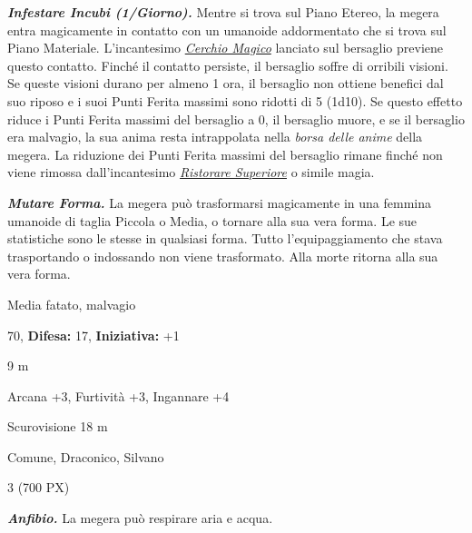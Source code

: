 \begin{multicols}{2}
{\emph{\textbf{Infestare Incubi (1/Giorno).}} Mentre si trova sul Piano Etereo, la megera entra magicamente in contatto con un umanoide addormentato che si trova sul Piano Materiale. L'incantesimo \emph{\hyperlink{Cerchio Magico}{Cerchio Magico}} lanciato sul bersaglio previene questo contatto. Finché il contatto persiste, il bersaglio soffre di orribili visioni. Se queste visioni durano per almeno 1 ora, il bersaglio non ottiene benefici dal suo riposo e i suoi Punti Ferita massimi sono ridotti di 5 (1d10). Se questo effetto riduce i Punti Ferita massimi del bersaglio a 0, il bersaglio muore, e se il bersaglio era malvagio, la sua anima resta intrappolata nella \emph{borsa delle anime} della megera. La riduzione dei Punti Ferita massimi del bersaglio rimane finché non viene rimossa dall'incantesimo \emph{\hyperlink{Ristorare Superiore}{Ristorare Superiore}} o simile magia.

\emph{\textbf{Mutare Forma.}} La megera può trasformarsi magicamente in una femmina umanoide di taglia Piccola o Media, o tornare alla sua vera forma. Le sue statistiche sono le stesse in qualsiasi forma. Tutto l'equipaggiamento che stava trasportando o indossando non viene trasformato. Alla morte ritorna alla sua vera forma.

\noindent
\begin{description}[noitemsep, topsep=0pt, parsep=0pt, partopsep=0pt, leftmargin=0cm, labelwidth=2.2cm]
	\item[\textbf{Taglia/Tipo:}] Media fatato, malvagio
	\item[\textbf{Caratt.:}] 
	\item[\textbf{Punti Ferita:}] 70,  \textbf{Difesa:} 17,  \textbf{Iniziativa:} +1
	\item[\textbf{Movimento:}] 9 m
	\item[\textbf{Tiri Salvez.:}] 
	\item[\textbf{Comp.:}] Arcana +3, Furtività +3, Ingannare +4
	\item[\textbf{Sensi:}] Scurovisione 18 m
	\item[\textbf{Linguaggi:}] Comune, Draconico, Silvano
	\item[\textbf{Sfida:}] 3 (700 PX)\smallskip
\end{description}

\emph{\textbf{Anfibio.}} La megera può respirare aria e acqua.

}
\end{multicols}
